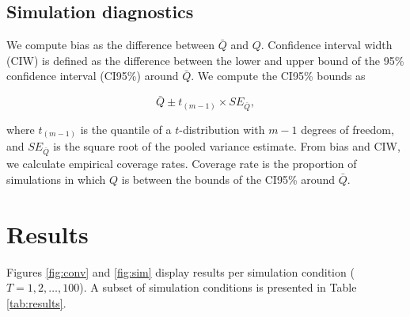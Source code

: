 \documentclass[article]{jss}
\begin{document}
\subsection{Simulation diagnostics}

We compute bias as the difference between $\bar{Q}$ and $Q$. Confidence interval width (CIW) is defined as the difference between the lower and upper bound of the 95\% confidence interval (CI95\%) around $\bar{Q}$. We compute the CI95\% bounds as 

$$\bar{Q} \pm t_{(m-1)} \times SE_{\bar{Q}},$$

where $t_{(m-1)}$ is the quantile of a $t$-distribution with $m-1$ degrees of freedom, and $SE_{\bar{Q}}$ is the square root of the pooled variance estimate. From bias and CIW, we calculate empirical coverage rates. Coverage rate is the proportion of simulations in which $Q$ is between the bounds of the CI95\% around $\bar{Q}$. 



\section{Results}


Figures \ref{fig:conv} and \ref{fig:sim} display results per simulation condition ($T = 1,2,\dots,100$). A subset of simulation conditions is presented in Table \ref{tab:results}. 
\end{document}
